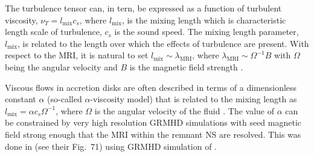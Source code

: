 The turbulence tensor can, in tern, be expressed as a function of 
turbulent viscosity, $\nu_T = l_{\text{mix}}c_s$, where $l_{\text{mix}}$,
is the mixing length which is characteristic length scale of turbulence, 
$c_s$ is the sound speed.
%
%
%
%
%
The mixing length parameter, $l_{\text{mix}}$, is related to the length 
over which the effects of turbulence are present. 
%
%
%
%
%
%
With respect to the \ac{MRI}, it is natural to set 
$l_{\text{mix}} \sim \lambda_{\text{MRI}}$, where 
$\lambda_{\text{MRI}} \sim \Omega^{-1}B$ with $\Omega$ 
being the angular velocity and $B$ is the magnetic
field strength \citep{Duez:2006qe}.

Viscous flows in accretion disks are often described in terms of a dimensionless 
constant $\alpha$ (so-called $\alpha$-viscosity model) that is related to the 
mixing length as 
%
$ l_{\text{mix}} = \alpha c_s \Omega^{-1} $, 
%
where $\Omega$ is the angular velocity of the fluid \citep{Shakura:1972te}.
%
The value of $\alpha$ can be constrained by very high resolution 
\ac{GRMHD} simulations with seed magnetic field 
strong enough that the \ac{MRI} within the remnant \ac{NS} are resolved. 
This was done in \citet{Radice:2020ids} (see their Fig.~71) 
using \ac{GRMHD} simulation of \citet{Kiuchi:2017zzg}.


